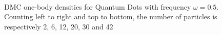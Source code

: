 \begin{figure}
\begin{center}
   \\
  \caption{DMC one-body densities for Quantum Dots with frequency $\omega=0.5$. Counting left to right and top to bottom, the number of particles is respectively 2, 6, 12, 20, 30 and 42}
  \label{fig:OBD_DMC_QDOTS_w05}
 \end{center}
\end{figure}


